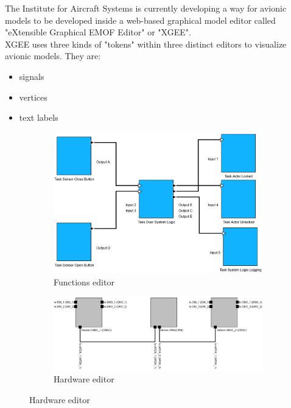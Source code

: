 The Institute for Aircraft Systems is currently developing a way for avionic models to be developed inside a web-based graphical model editor called "eXtensible Graphical EMOF Editor" or "XGEE".\\
XGEE uses three kinds of "tokens" within three distinct editors to visualize avionic models. They are:
\begin{itemize}
    \item signals
    \item vertices
    \item text labels
\end{itemize}
\begin{figure}[h]
    \centering
    \begin{subfigure}{0.3\textwidth}
        \includegraphics[width=\linewidth]{Pictures/functions_editor.png}
        \caption{Functions editor}
        \label{fig_functions_editor_en}
    \end{subfigure}
    \hfill
    \begin{subfigure}{0.3\textwidth}
        \includegraphics[width=\linewidth]{Pictures/hardware_editor.png}
        \caption{Hardware editor}
        \label{fig_hardware_editor_en}
    \end{subfigure}

\end{figure}

